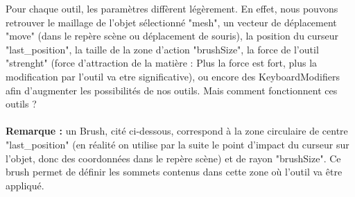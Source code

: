 \documentclass[a4paper]{memoir}
\begin{document}
					Pour chaque outil, les paramètres diffèrent légèrement. En effet, nous pouvons retrouver le maillage de l'objet sélectionné "mesh",  un vecteur de déplacement "move" (dans le 
					repère scène ou déplacement de souris), la position du curseur "last\_position", la taille de la zone d'action "brushSize", la force de 
					l'outil "strenght" (force d'attraction de la matière : Plus la force est fort, plus la modification par l'outil va etre significative), ou encore des KeyboardModifiers afin d'augmenter les possibilités de nos outils. 
					Mais comment fonctionnent ces outils ?\\\\
					\textbf{Remarque :} un Brush, cité ci-dessous, correspond à la zone circulaire de centre "last\_position" (en réalité on utilise par la 
					suite le point d'impact du curseur sur l'objet, donc des coordonnées dans le repère scène) et de rayon "brushSize". Ce brush permet de définir les sommets contenus dans cette zone où l'outil va être appliqué.
\end{document}
